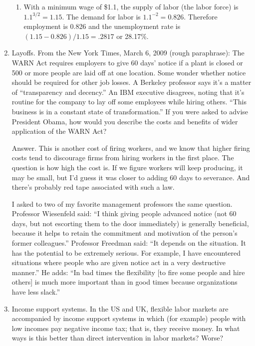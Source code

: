 \documentclass[letterpaper,12pt]{article}
\begin{document}
\begin{enumerate}
\begin{enumerate}
\item With a minimum wage of \$1.1, the supply of labor (the labor
force) is $1.1^{{3}/{2}} = 1.15$. The demand for labor is
$1.1^{-2}=0.826$. Therefore employment is 0.826 and the
unemployment rate is $(1.15-0.826)/{1.15}= .2817$ or 28.17\%.
\end{enumerate}


\item Layoffs.
From the New York Times, March 6, 2009 (rough paraphrase):
The WARN Act requires employers to give 60 days' notice
if a plant is closed or 500 or more people are laid off at one location.
Some wonder whether notice should be required for other job losses.
A Berkeley professor says
it's a matter of ``transparency and decency.''
An IBM executive disagrees, noting that it's routine for the company to lay off some employees while hiring others.
``This business is in a constant state of transformation.''
If you were asked to advise President Obama,
how would you describe the costs and benefits of
wider application of the WARN Act?

Answer.
This is another cost of firing workers,
and we know that higher firing costs tend to discourage firms
from hiring workers in the first place.
The question is how high the cost is.
If we figure workers will keep producing, it may be small,
but I'd guess it was closer to adding 60 days to severance.
And there's probably red tape associated with such a law.

I asked to two of my favorite management professors
the same question.
Professor Wiesenfeld said:
``I think giving people advanced notice (not 60 days, but not escorting them to the door immediately) is generally beneficial,
because it helps to retain the commitment and motivation of the person's former colleagues.''
Professor Freedman said:
``It depends on the situation.  It has the potential to be extremely serious. For example, I have encountered situations where people who are given notice act in a very destructive manner.''
He adds:
``In bad times the flexibility [to fire some people and hire others]
is much more important than in good times because organizations have less slack.''

\item Income support systems.
In the US and UK, flexible labor markets are accompanied by
income support systems in which (for example) people with low
incomes pay negative income tax; that is, they receive money.
In what ways is this better than direct intervention in labor markets?  Worse?


\end{enumerate}
\end{document}
